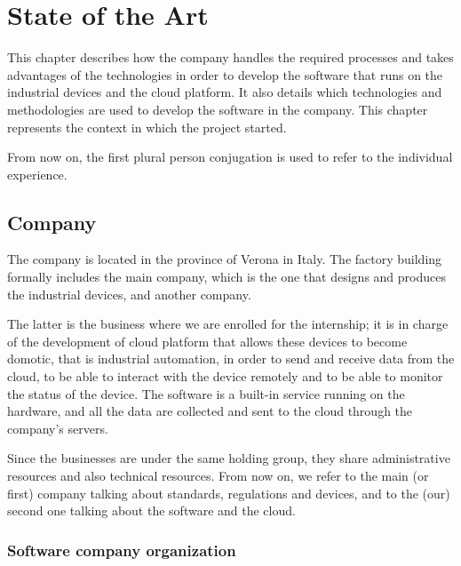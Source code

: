 \chapter{State of the Art}

This chapter describes how the company handles the required processes and takes advantages of the technologies in order to develop the software that runs on the industrial devices and the cloud platform. It also details which technologies and methodologies are used to develop the software in the company. This chapter represents the context in which the project started.

From now on, the first plural person conjugation is used to refer to the individual experience.

\section{Company}

The company is located in the province of Verona in Italy. The factory building formally includes the main company, which is the one that designs and produces the industrial devices, and another company.

The latter is the business where we are enrolled for the internship; it is in charge of the development of cloud platform that allows these devices to become domotic, that is industrial automation, in order to send and receive data from the cloud, to be able to interact with the device remotely and to be able to monitor the status of the device. The software is a built-in service running on the hardware, and all the data are collected and sent to the cloud through the company's servers.

Since the businesses are under the same holding group, they share administrative resources and also technical resources. From now on, we refer to the main (or first) company talking about standards, regulations and devices, and to the (our) second one talking about the software and the cloud.

\subsection{Software company organization}

